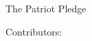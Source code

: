 \begin{titlepage}
	\vspace*{5em}
	\begin{center}
		{
			\huge The Patriot Pledge 
		} \\
		\vspace*{4em}
		{
			{
				\large Contributors:
			} \\ 
			\vspace*{1em}
			
		}
	\end{center}
\end{titlepage}